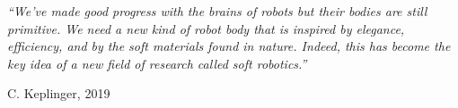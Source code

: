 \documentclass[a4paper, 11pt, oneside]{Thesis}  %
\begin{document}
	\clearpage  %
	\pagestyle{empty}  %
	\null\vfill
	\textit{``We've made good progress with the brains of robots but their bodies are still primitive. We need a new kind of robot body that is inspired by elegance, efficiency, and by the soft materials found in nature. Indeed, this has become the key idea of a new field of research called soft robotics.''}
	\begin{flushright}
		C. Keplinger, 2019
	\end{flushright}
	\vfill\vfill\vfill\vfill\vfill\vfill\null
	\clearpage  %
\end{document}
